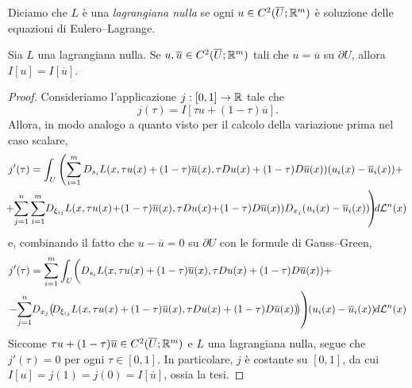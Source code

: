 \begin{definizione}
	Diciamo che $L$ è una \emph{lagrangiana nulla} se ogni $u \in C^2(\overline{U};\mathbb{R}^m)$ è soluzione delle equazioni di Eulero--Lagrange.
\end{definizione}

\begin{teorema}
	Sia $L$ una lagrangiana nulla. Se $u,\overline{u}\in C^2(\overline{U};\mathbb{R}^m)$ tali che $u = \overline{u}$ su $\partial U$, allora $I[u] = I[\overline{u}]$.
\end{teorema}
\begin{proof}
	Consideriamo l'applicazione $j: [0,1] \to \mathbb{R}$ tale che	
	\[ j(\tau) = I[\tau u + (1-\tau)\overline{u}]. \]
	Allora, in modo analogo a quanto visto per il calcolo della variazione prima nel caso scalare, 
	\begin{align*}
		&j'(\tau) = \int_U \left( \sum_{i=1}^{m}D_{s_i}L(x,\tau u(x)+(1-\tau)\overline{u}(x), \tau Du(x) + (1-\tau)D\overline{u}(x))(u_i(x)-\overline{u}_i(x)) + \right. \\
		&\left. \hspace{-5pt}+ \hspace{-2pt}\sum_{j=1}^{n} \sum_{i=1}^{m} \hspace{-2pt} D_{\xi_{ij}}L(x,\tau u(x)\hspace{-2pt}+\hspace{-2pt}(1-\tau)\overline{u}(x), \tau Du(x)\hspace{-2pt} + \hspace{-2pt}(1-\tau)D\overline{u}(x)) D_{x_j}(u_i(x)-\overline{u}_i(x))\hspace{-2pt} \right) \hspace{-4pt}d\mathcal{L}^n(x)
	\end{align*}
	e, combinando il fatto che $u - \overline{u} = 0$ su $\partial U$ con le formule di Gauss--Green,
	\begin{align*}
		&j'(\tau) = \sum_{i=1}^{m}\int_U \biggl( D_{s_i}L(x,\tau u(x)+(1-\tau)\overline{u}(x), \tau Du(x) + (1-\tau)D\overline{u}(x)) + \\
		&\left.\hspace{-2pt} - \hspace{-2pt}\sum_{j=1}^{n}\hspace{-2pt}D_{x_j}\hspace{-2pt}\left( \hspace{-2pt} D_{\xi_{ij}}L(x,\tau u(x)+(1-\tau)\overline{u}(x), \tau Du(x) + (1-\tau)D\overline{u}(x))\hspace{-2pt}\right)  \right)\hspace{-3pt}(u_i(x)-\overline{u}_i(x)) \hspace{-1pt}d\mathcal{L}^n(x)
	\end{align*}
	Siccome $\tau u +(1-\tau)\overline{u} \in C^2(\overline{U};\mathbb{R}^m)$ e $L$ una lagrangiana nulla, segue che $j'(\tau) = 0$ per ogni $\tau \in [0,1]$. In particolare, $j$ è costante su $[0,1]$, da cui $I[u] = j(1) = j(0) = I[\overline{u}]$, ossia la tesi.
\end{proof}


